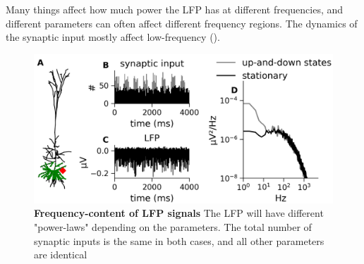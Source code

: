 Many things affect how much power the LFP has at different frequencies, and different parameters can often affect different frequency regions. The dynamics of the synaptic input mostly affect low-frequency ().
\begin{figure}[!ht]
\begin{center}
\includegraphics[width=.7\textwidth]{Figures/LFP/fig_LFP_powerlaws_input_dynamics.png}
\end{center}
\caption{\textbf{Frequency-content of LFP signals}
The LFP will have different "power-laws" depending on the parameters. The total number of synaptic inputs is the same in both cases, and all other parameters are identical
}
\label{fig:LFP:psd_input}
\end{figure}




